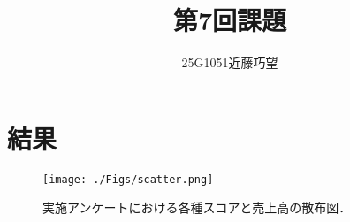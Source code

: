 \documentclass[uplatex]{jsarticle}
\begin{document}
\title{第7回課題}
\author{25G1051近藤巧望}
\maketitle

\section{結果}

\begin{figure}[htb]
\centering
\texttt{[image: ./Figs/scatter.png]}
\caption{実施アンケートにおける各種スコアと売上高の散布図．}
\label{fig:1-1}
\end{figure}
\end{document}
